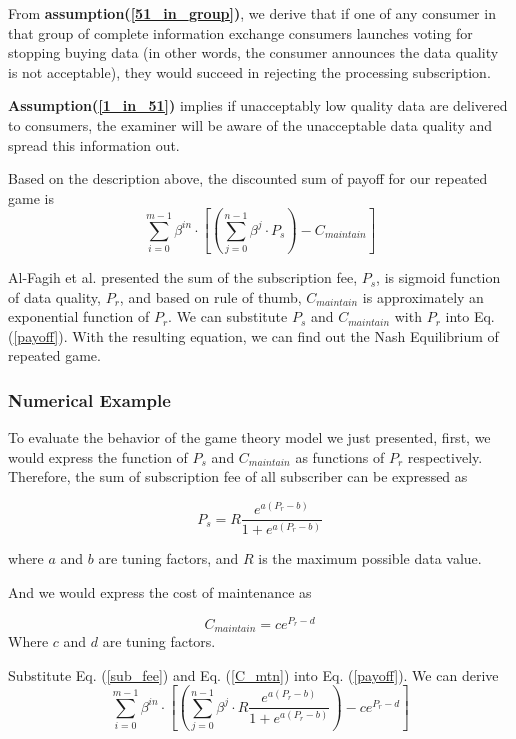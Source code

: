 \documentclass[journal,article,applsci,submit,moreauthors,pdftex]{Definitions/mdpi}
\begin{document}
From \textbf{assumption(\ref{51_in_group})}, we derive that if one of any consumer in that group of complete information exchange consumers launches voting for stopping buying data (in other words, the consumer announces the data quality is not acceptable), they would succeed in rejecting the processing subscription.

\textbf{Assumption(\ref{1_in_51})} implies if unacceptably low quality data are delivered to consumers, the examiner will be aware of the unacceptable data quality and spread this information out.


Based on the description above, the discounted sum of payoff for our repeated game is
\begin{equation} \label{payoff}
    \sum_{i=0}^{m - 1}{\beta^{in}\cdot [(\sum_{j=0}^{n - 1} \beta^j \cdot P_s) - C_{maintain}]}
\end{equation}

Al-Fagih et al. presented\cite{DataPrice} the sum of the subscription fee, $P_s$, is sigmoid function of data quality, $P_r$, and based on rule of thumb, $C_{maintain}$ is approximately an exponential function of $P_r$. We can substitute $P_s$ and $C_{maintain}$ with $P_r$ into Eq. (\ref{payoff}). With the resulting equation, we can find out the Nash Equilibrium of repeated game.

\subsubsection{Numerical Example}
To evaluate the behavior of the game theory model we just presented, first, we would express the function of $P_s$ and $C_{maintain}$ as functions of $P_r$ respectively. Therefore, the sum of subscription fee of all subscriber can be expressed as

\begin{equation} \label{sub_fee}
    P_s = R \frac{e^{a (P_r - b)}}{1 + e^{a (P_r - b)}}
\end{equation}

where $a$ and $b$ are tuning factors, and $R$ is the maximum possible data value.

And we would express the cost of maintenance as

\begin{equation} \label{C_mtn}
    C_{maintain} = ce^{P_r - d}
\end{equation}
Where $c$ and $d$ are tuning factors.

Substitute Eq. (\ref{sub_fee}) and Eq. (\ref{C_mtn}) into Eq. (\ref{payoff}). We can derive
\begin{equation} \label{payoff_Pr}
    \sum_{i=0}^{m - 1}{\beta^{in}\cdot [(\sum_{j=0}^{n - 1} \beta^j \cdot R \frac{e^{a (P_r - b)}}{1 + e^{a (P_r - b)}}) - ce^{P_r - d}]}
\end{equation}
\end{document}
